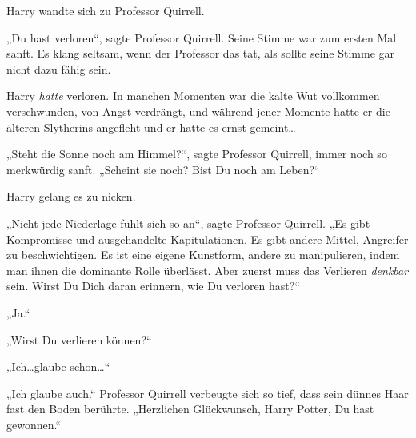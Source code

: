 Harry wandte sich zu Professor Quirrell.

„Du hast verloren“, sagte Professor Quirrell. Seine Stimme war zum ersten Mal sanft. Es klang seltsam, wenn der Professor das tat, als sollte seine Stimme gar nicht dazu fähig sein.

Harry \emph{hatte} verloren. In manchen Momenten war die kalte Wut vollkommen verschwunden, von Angst verdrängt, und während jener Momente hatte er die älteren Slytherins angefleht und er hatte es ernst gemeint…

„Steht die Sonne noch am Himmel?“, sagte Professor Quirrell, immer noch so merkwürdig sanft. „Scheint sie noch? Bist Du noch am Leben?“

Harry gelang es zu nicken.

„Nicht jede Niederlage fühlt sich so an“, sagte Professor Quirrell. „Es gibt Kompromisse und ausgehandelte Kapitulationen. Es gibt andere Mittel, Angreifer zu beschwichtigen. Es ist eine eigene Kunstform, andere zu manipulieren, indem man ihnen die dominante Rolle überlässt. Aber zuerst muss das Verlieren \emph{denkbar} sein. Wirst Du Dich daran erinnern, wie Du verloren hast?“

„Ja.“

„Wirst Du verlieren können?“

„Ich…glaube schon…“

„Ich glaube auch.“ Professor Quirrell verbeugte sich so tief, dass sein dünnes Haar fast den Boden berührte. „Herzlichen Glückwunsch, Harry Potter, Du hast gewonnen.“

